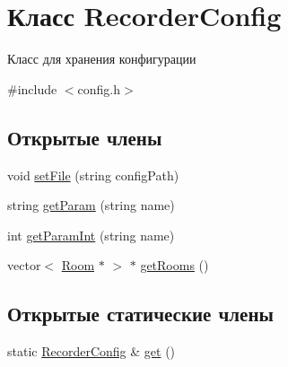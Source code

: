 \hypertarget{class_recorder_config}{}\section{Класс Recorder\+Config}
\label{class_recorder_config}


Класс для хранения конфигурации  




{\ttfamily \#include $<$config.\+h$>$}

\subsection*{Открытые члены}
\begin{DoxyCompactItemize}
\item 
void \hyperlink{class_recorder_config_a50fff4cd104ffad261f37e2162aefaf8}{set\+File} (string config\+Path)
\item 
string \hyperlink{class_recorder_config_afc65f46a71f6bacd707dbf461a5bfddb}{get\+Param} (string name)
\item 
int \hyperlink{class_recorder_config_a01e6881ce3a3b19990c53f62810daa4b}{get\+Param\+Int} (string name)
\item 
vector$<$ \hyperlink{class_room}{Room} $\ast$ $>$ $\ast$ \hyperlink{class_recorder_config_a38b5049c8ea73fbe7fe06bfca6fa216a}{get\+Rooms} ()
\end{DoxyCompactItemize}
\subsection*{Открытые статические члены}
\begin{DoxyCompactItemize}
\item 
static \hyperlink{class_recorder_config}{Recorder\+Config} \& \hyperlink{class_recorder_config_a479f393f92d02955bd5c429c7723c79c}{get} ()
\end{DoxyCompactItemize}
